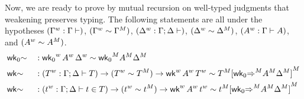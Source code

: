 Now, we are ready to prove by mutual recursion on well-typed judgments that
weakening preserves typing. The following statements are all under the
hypotheses
  $({\Gamma}^w : \Gamma \vdash)$,
  $({\Gamma}^w \sim {\Gamma}^M)$,
  $({\Delta}^w : \Gamma;\Delta \vdash)$,
  $({\Delta}^w \sim {\Delta}^M)$,
  $({A}^w : \Gamma \vdash A)$,
  and
  $({A}^w \sim {A}^M)$.
\begin{alignat*}{5}
  & \wkO{\sim}  &&
   :
  \wf{\wkO}\,\wf{A}\,\wf{\Delta}\sim\model{\wkO}\model{A}\model{\Delta}
  \\
  & \wk{\sim} && :
  (\wf{T} : \Gamma\merge\Delta \vdash T) \ra
  (\wf{T} \sim \model{T}) \ra
  \wf{\wk}\,\wf{A}\,\wf{T}\sim\model{T}\model{[\model{\wkO{\Rightarrow}}\model{A}\model{\Delta}]}
  \\
  & \wk{\sim} && :
  (\wf{t} : \Gamma\merge\Delta \vdash t\in T) \ra
  (\wf{t} \sim \model{t}) \ra
  \wf{\wk}\,\wf{A}\,\wf{t}\sim\model{t}\model{[\model{\wkO{\Rightarrow}}\model{A}\model{\Delta}]}
  \\

\end{alignat*}
